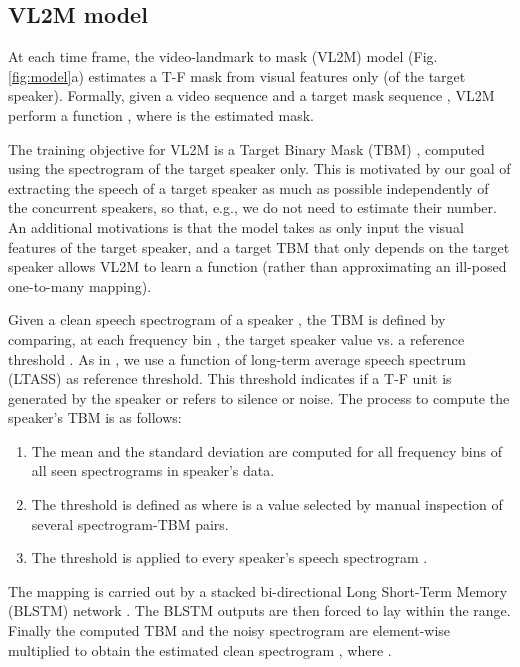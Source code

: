 \documentclass{article}
\begin{document}
\subsection{VL2M model}
\label{ssec:vidland2mask}
At each time frame, the video-landmark to mask (VL2M)  model (Fig. \ref{fig:model}a) estimates a T-F mask from visual features only (of the target speaker).
Formally, given a video sequence  and a target mask sequence , VL2M perform a function , where  is the estimated mask. 

The training objective for VL2M is a Target Binary Mask (TBM) \cite{Anzalone2006, Kjems2009}, computed using the spectrogram of the target speaker only. This is motivated by our goal of
extracting the speech of a target speaker as much as possible independently of the concurrent speakers, so that, e.g., we do not need to estimate their number. 
An additional motivations is that the model takes as only input the visual features of the target speaker, and a target TBM that only depends on the target speaker allows VL2M to learn a function (rather than approximating an ill-posed one-to-many mapping).


Given a clean speech spectrogram of a speaker , the TBM is defined by comparing, at each frequency bin , the target speaker value  vs. a reference threshold . As in \cite{gabbay_seeing_2017}, we use a function of long-term average speech spectrum (LTASS) as reference threshold. This threshold indicates if a T-F unit is generated by the speaker or refers to silence or noise. The process to compute the speaker's TBM is as follows:
\begin{enumerate}
    \item The mean  and the standard deviation  are computed for all frequency bins of all seen spectrograms in speaker's data.
    \item The threshold  is defined as     where  is a value selected by manual inspection of several spectrogram-TBM pairs.
    \item The threshold is applied to every speaker's speech spectrogram .
    
\end{enumerate}

The mapping  is carried out by a stacked bi-directional Long Short-Term Memory (BLSTM) network \cite{graves13}.
The BLSTM outputs are then forced to lay within the  range. Finally the computed TBM  and the noisy spectrogram  are element-wise multiplied to obtain the estimated clean spectrogram , where .
\end{document}
